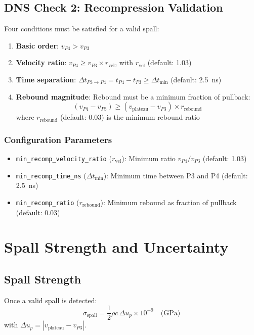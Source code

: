 \subsection{DNS Check 2: Recompression Validation}
Four conditions must be satisfied for a valid spall:
\begin{enumerate}
    \item \textbf{Basic order}: $v_{P4} > v_{P3}$
    \item \textbf{Velocity ratio}: $v_{P4} \geq v_{P3} \times r_{\text{vel}}$, with $r_{\text{vel}}$ (default: 1.03)
    \item \textbf{Time separation}: $\Delta t_{P3 \to P4} = t_{P4} - t_{P3} \geq \Delta t_{\min}$ (default: \SI{2.5}{ns})
    \item \textbf{Rebound magnitude}: Rebound must be a minimum fraction of pullback:
    \begin{equation}
    (v_{P4} - v_{P3}) \geq (v_{\text{plateau}} - v_{P3}) \times r_{\text{rebound}}
    \end{equation}
    where $r_{\text{rebound}}$ (default: 0.03) is the minimum rebound ratio
\end{enumerate}

\subsubsection{Configuration Parameters}
\begin{itemize}
    \item \texttt{min\_recomp\_velocity\_ratio} ($r_{\text{vel}}$): Minimum ratio $v_{P4}/v_{P3}$ (default: 1.03)
    \item \texttt{min\_recomp\_time\_ns} ($\Delta t_{\min}$): Minimum time between P3 and P4 (default: \SI{2.5}{ns})
    \item \texttt{min\_recomp\_ratio} ($r_{\text{rebound}}$): Minimum rebound as fraction of pullback (default: 0.03)
\end{itemize}

\section{Spall Strength and Uncertainty}

\subsection{Spall Strength}
Once a valid spall is detected:
\begin{equation}
\sigma_{\text{spall}} = \frac{1}{2} \rho c \, \Delta u_p \times 10^{-9} \quad \text{(GPa)}
\end{equation}
with $\Delta u_p = |v_{\text{plateau}} - v_{P3}|$.

